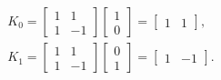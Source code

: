\begin{equation}
  \begin{array}{l}
    K_0 =
    \begin{bmatrix}
      1 & 1 \\
      1 & -1
    \end{bmatrix}
          \begin{bmatrix}
            1 \\
            0
          \end{bmatrix}
    =
    \begin{bmatrix}
      1 & 1
    \end{bmatrix},
    \\
    K_1 = 
    \begin{bmatrix}
      1 & 1 \\
      1 & -1
    \end{bmatrix}
          \begin{bmatrix}
            0 \\
            1
          \end{bmatrix}
    =
    \begin{bmatrix}
      1 & -1
    \end{bmatrix}.
  \end{array}
\end{equation}

